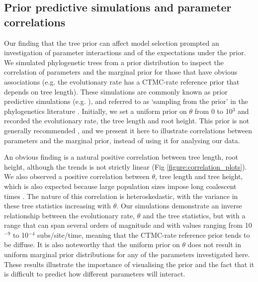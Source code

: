 \documentclass[10pt,letterpaper]{article}
\begin{document}
\subsection*{Prior predictive simulations and parameter correlations}
Our finding that the tree prior can affect model selection prompted an investigation of parameter interactions and of the expectations under the prior. We simulated phylogenetic trees from a prior distribution to inspect the correlation of parameters and the marginal prior for those that have obvious associations (e.g. the evolutionary rate has a CTMC-rate reference prior that depends on tree length). These simulations are commonly known as prior predictive simulations (e.g. \cite{wesner2021choosing}), and referred to as `sampling from the prior' in the phylogenetics literature \cite{nascimento2017biologist}. Initially, we set a uniform prior on $\theta$ from 0 to 10$^3$ and recorded the evolutionary rate, the tree length and root height. This prior is not generally recommended \cite{bouckaertDating}, and we present it here to illustrate correlations between parameters and the marginal prior, instead of using it for analysing our data.

An obvious finding is a natural positive correlation between tree length, root height, although the trends is not strictly linear (Fig \ref{figure:correlation_plots}). We also observed a positive correlation between $\theta$, tree length and tree height, which is also expected because large population sizes impose long coalescent times \cite{rosenberg2002genealogical}. The nature of this correlation is heteroskedastic, with the variance in these tree statistics increasing with $\theta$. Our simulations demonstrate an inverse relationship between the evolutionary rate, $\theta$ and the tree statistics, but with a range that can span several orders of magnitude and with values ranging from 10$^{-9}$ to 10$^{-4}$ subs/site/time, meaning that the CTMC-rate reference prior tends to be diffuse. It is also noteworthy that the uniform prior on $\theta$ does not result in uniform marginal prior distributions for any of the parameters investigated here. These results illustrate the importance of visualising the prior and the fact that it is difficult to predict how different parameters will interact.
\end{document}
